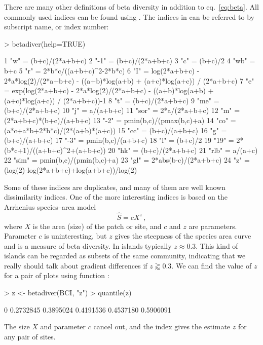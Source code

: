 \documentclass[a4paper,10pt,twocolumn]{article}
\begin{document}
There are many other definitions of beta diversity in addition to
eq.~\ref{eq:beta}.  All commonly used indices can be found using
 \citep{KoleffEtal03}. The indices in 
can be referred to by subscript name, or index number:
\begin{Schunk}
\begin{Sinput}
> betadiver(help=TRUE)
\end{Sinput}
\begin{Soutput}
1 "w" = (b+c)/(2*a+b+c)
2 "-1" = (b+c)/(2*a+b+c)
3 "c" = (b+c)/2
4 "wb" = b+c
5 "r" = 2*b*c/((a+b+c)^2-2*b*c)
6 "I" = log(2*a+b+c) - 2*a*log(2)/(2*a+b+c) -
((a+b)*log(a+b) + (a+c)*log(a+c)) / (2*a+b+c)
7 "e" = exp(log(2*a+b+c) - 2*a*log(2)/(2*a+b+c)
- ((a+b)*log(a+b) + (a+c)*log(a+c)) /
(2*a+b+c))-1
8 "t" = (b+c)/(2*a+b+c)
9 "me" = (b+c)/(2*a+b+c)
10 "j" = a/(a+b+c)
11 "sor" = 2*a/(2*a+b+c)
12 "m" = (2*a+b+c)*(b+c)/(a+b+c)
13 "-2" = pmin(b,c)/(pmax(b,c)+a)
14 "co" = (a*c+a*b+2*b*c)/(2*(a+b)*(a+c))
15 "cc" = (b+c)/(a+b+c)
16 "g" = (b+c)/(a+b+c)
17 "-3" = pmin(b,c)/(a+b+c)
18 "l" = (b+c)/2
19 "19" = 2*(b*c+1)/((a+b+c)^2+(a+b+c))
20 "hk" = (b+c)/(2*a+b+c)
21 "rlb" = a/(a+c)
22 "sim" = pmin(b,c)/(pmin(b,c)+a)
23 "gl" = 2*abs(b-c)/(2*a+b+c)
24 "z" = (log(2)-log(2*a+b+c)+log(a+b+c))/log(2)
\end{Soutput}
\end{Schunk}
Some of these indices are duplicates, and many of them are well known
dissimilarity indices.
One of the more interesting indices is based
on the Arrhenius species--area model
\begin{equation}
  \label{eq:arrhenius}
  \hat S = c X^z\,,
\end{equation}
where $X$ is the area (size) of the patch or site, and $c$ and $z$ are
parameters. Parameter $c$ is uninteresting, but $z$ gives the
steepness of the species area curve and is a measure of beta
diversity. In islands typically  $z \approx 0.3$. This kind of
islands can be regarded as subsets of the same community, indicating
that we really should talk about gradient differences if $z \gtrapprox 0.3$. We
can find the value of $z$ for a pair of plots using function
:
\begin{Schunk}
\begin{Sinput}
> z <- betadiver(BCI, "z")
> quantile(z)
\end{Sinput}
\begin{Soutput}
       0%       25%       50%       75%      100% 
0.2732845 0.3895024 0.4191536 0.4537180 0.5906091 
\end{Soutput}
\end{Schunk}
The size $X$ and parameter $c$ cancel out, and the index gives the
estimate $z$ for any pair of sites.
\end{document}
